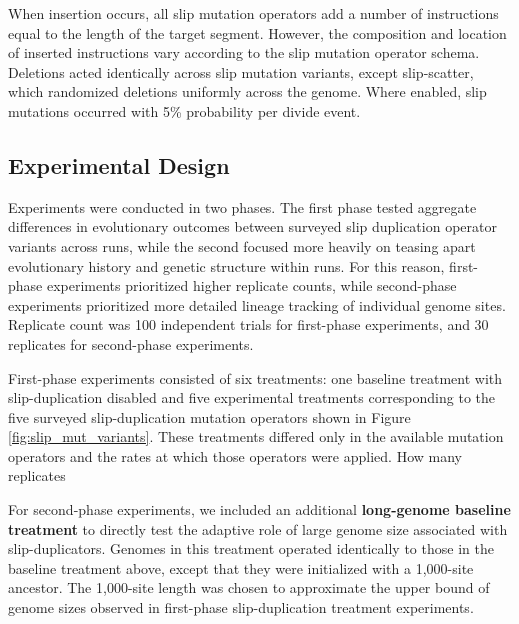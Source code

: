 When insertion occurs, all slip mutation operators add a number of instructions equal to the length of the target segment.
However, the composition and location of inserted instructions vary according to the slip mutation operator schema.
Deletions acted identically across slip mutation variants, except slip-scatter, which randomized deletions uniformly across the genome.
Where enabled, slip mutations occurred with 5\% probability per divide event.

\subsection{Experimental Design}

Experiments were conducted in two phases.
The first phase tested aggregate differences in evolutionary outcomes between surveyed slip duplication operator variants across runs, while the second focused more heavily on teasing apart evolutionary history and genetic structure within runs.
For this reason, first-phase experiments prioritized higher replicate counts, while second-phase experiments prioritized more detailed lineage tracking of individual genome sites.
Replicate count was 100 independent trials for first-phase experiments, and 30 replicates for second-phase experiments.

First-phase experiments consisted of six treatments: one baseline treatment with slip-duplication disabled and five experimental treatments corresponding to the five surveyed slip-duplication mutation operators shown in Figure \ref{fig:slip_mut_variants}.
These treatments differed only in the available mutation operators and the rates at which those operators were applied.
How many replicates


For second-phase experiments, we included an additional \textbf{long-genome baseline treatment} to directly test the adaptive role of large genome size associated with slip-duplicators.
Genomes in this treatment operated identically to those in the baseline treatment above, except that they were initialized with a 1,000-site ancestor.
The 1,000-site length was chosen to approximate the upper bound of genome sizes observed in first-phase slip-duplication treatment experiments.

